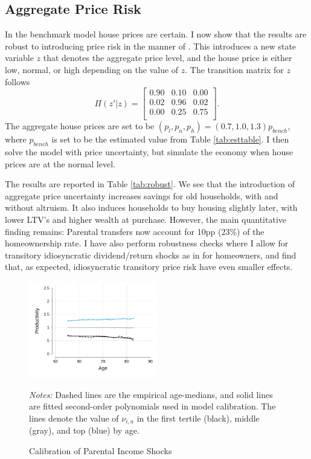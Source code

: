 \documentclass[12pt]{article}
\begin{document}
\subsection{Aggregate Price Risk}\label{sec:robust_pricerisk}
In the benchmark model house prices are certain. I now show that the results are robust to introducing price risk in the manner of \cite{Corbae2015}. This introduces a new state variable $z$ that denotes the aggregate price level, and the house price is either low, normal, or high depending on the value of $z$. The transition matrix for $z$ follows 
\begin{equation}
\Pi(z'|z) = \begin{bmatrix}
0.90 & 0.10 & 0.00 \\
0.02 & 0.96 & 0.02 \\
0.00 & 0.25 & 0.75 \\
\end{bmatrix}.
\end{equation}
The aggregate house prices are set to be $(p_l,p_n,p_h)=(0.7,1.0,1.3)p_{bench}$, where $p_{bench}$ is set to be the estimated value from Table \ref{tab:esttable}. I then solve the model with price uncertainty, but simulate the economy when house prices are at the normal level. 

The results are reported in Table \ref{tab:robust}. We see that the introduction of aggregate price uncertainty increases savings for old households, with and without altruism. It also induces households to buy housing slightly later, with lower LTV's and higher wealth at purchase. However, the main quantitative finding remains: Parental transfers now account for 10pp (23\%) of the homeownership rate. I have also perform robustness checks where I allow for transitory idiosyncratic dividend/return shocks as in \cite{Chang2024} for homeowners, and find that, as expected, idiosyncratic transitory price risk have even smaller effects.



\begin{figure}
    \caption{Calibration of Parental Income Shocks}\label{fig:nu}
	{\centering
    \includegraphics[width=0.5\textwidth]{../tabfig/empirical/lifecycleproductivity_old_3}
    \par}    {\begin{footnotesize} \textit{Notes:}
        Dashed lines are the empirical age-medians, and solid lines are fitted second-order polynomials used in model calibration. The lines denote the value of $\nu_{i,a}$ in the first tertile (black), middle (gray), and top (blue) by age.
    \end{footnotesize}}
\end{figure}
\end{document}
